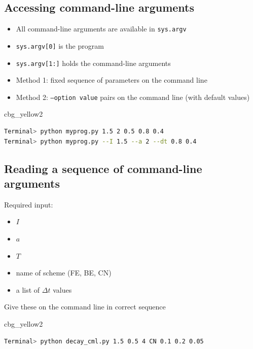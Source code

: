 \documentclass[%
oneside,                 %
final,                   %
10pt]{article}
\newenvironment{_cod_tight}[1]{
   \def\FrameCommand{\colorbox{#1}}
   \FrameRule0.6pt\MakeFramed {\FrameRestore}\vskip3mm}
   {\vskip0mm\endMakeFramed}
\newenvironment{cod}[1]{
\bgroup\rmfamily
\fboxsep=0mm\relax
\begin{_cod_tight}{#1}
\list{}{\parsep=-2mm\parskip=0mm\topsep=0pt\leftmargin=2mm
\rightmargin=2\leftmargin\leftmargin=4pt\relax}
\item\relax}
{\endlist\end{_cod_tight}\egroup}
\begin{document}
\noindent
\subsection*{Accessing command-line arguments}

\begin{itemize}
 \item All command-line arguments are available in \texttt{sys.argv}

 \item \texttt{sys.argv[0]} is the program

 \item \texttt{sys.argv[1:]} holds the command-line arguments

 \item Method 1: fixed sequence of parameters on the command line

 \item Method 2: \texttt{--option value} pairs on the command line (with default values)
\end{itemize}

\noindent
\begin{cod}{cbg_yellow2}\begin{lstlisting}[language=bash,style=simple,xleftmargin=2mm]
Terminal> python myprog.py 1.5 2 0.5 0.8 0.4
Terminal> python myprog.py --I 1.5 --a 2 --dt 0.8 0.4
\end{lstlisting}\end{cod}
\noindent

\subsection*{Reading a sequence of command-line arguments}

Required input:

\begin{itemize}
 \item $I$

 \item $a$

 \item $T$

 \item name of scheme (FE, BE, CN)

 \item a list of $\Delta t$ values
\end{itemize}

\noindent
Give these on the command line in correct sequence

\begin{cod}{cbg_yellow2}\begin{lstlisting}[language=bash,style=simple,xleftmargin=2mm]
Terminal> python decay_cml.py 1.5 0.5 4 CN 0.1 0.2 0.05
\end{lstlisting}\end{cod}
\noindent
\end{document}
